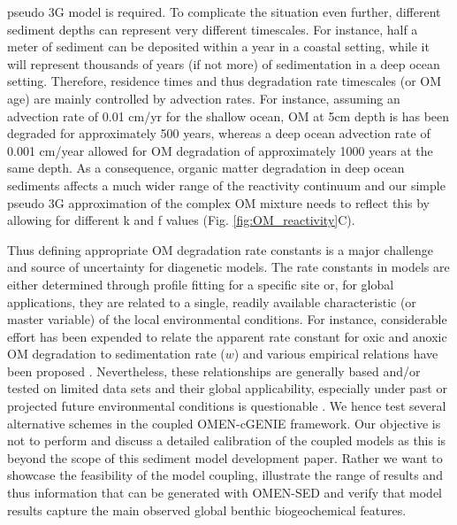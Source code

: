 \documentclass[gmd, manuscript]{copernicus}
\begin{document}
pseudo 3G model  \citep[including two degradable and one refractory fraction][]{soetaert_model_1996, boudreau1997diagenetic, stolpovsky_toward_2015} is required. 
To complicate the situation even further, different sediment depths can represent very different timescales. For instance, half a meter of sediment can be deposited within a year in a coastal setting, while it will represent thousands of years 
(if not more) of sedimentation in a deep ocean setting. Therefore, residence times and thus degradation rate timescales (or OM age) are mainly controlled by advection rates. For instance, assuming an advection rate of 0.01 cm/yr for the shallow ocean, OM 
at 5cm depth is has been degraded for approximately 500 years, whereas a deep ocean advection rate of 0.001 cm/year allowed for OM degradation of approximately 1000 years at the same depth. As a consequence, organic matter degradation in deep 
ocean sediments affects a much wider range of the reactivity continuum and our simple pseudo 3G approximation of the complex OM mixture needs to reflect this by allowing for different k and f values (Fig. \ref{fig:OM_reactivity}C).  

Thus defining appropriate OM degradation rate constants is a major challenge and source of uncertainty for diagenetic models. The rate constants in models are either determined through profile fitting for a specific site or, 
for global applications, they are related to a single, readily available characteristic (or master variable) of the local environmental conditions. 
For instance, considerable effort has been expended to relate the apparent rate constant for oxic and 
anoxic OM degradation to sedimentation rate ($w$) and various empirical relations have been proposed \citep{toth_organic_1977, tromp_global_1995, boudreau1997diagenetic, stolpovsky_toward_2015}. 
Nevertheless, these relationships are generally based and/or tested on limited data sets and their global applicability, especially under past or projected future environmental conditions is questionable \citep{arndt_quantifying_2013}. 
We hence test several alternative schemes in the coupled OMEN-cGENIE framework. 
Our objective is not to perform and discuss a detailed calibration of the coupled models as this is beyond the scope of this sediment model development paper. 
Rather we want to showcase the feasibility of the model coupling, illustrate the range of results and thus information that can be generated with OMEN-SED and verify that model results capture the main observed global benthic biogeochemical features. 
\end{document}
